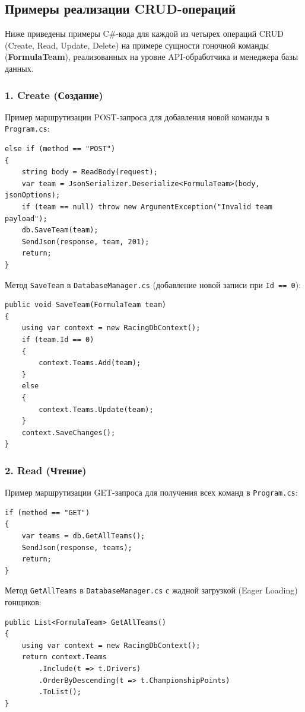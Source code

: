 \documentclass[oneside,a4paper,14pt]{extarticle}
\begin{document}
\subsection*{Примеры реализации CRUD-операций}

Ниже приведены примеры C\#-кода для каждой из четырех операций CRUD (Create, Read, Update, Delete) на примере сущности гоночной команды (\textbf{FormulaTeam}), реализованных на уровне API-обработчика и менеджера базы данных.

\subsubsection*{1. Create (Создание)}
Пример маршрутизации POST-запроса для добавления новой команды в \texttt{Program.cs}:
\begin{verbatim}
else if (method == "POST")
{
    string body = ReadBody(request);
    var team = JsonSerializer.Deserialize<FormulaTeam>(body, jsonOptions);
    if (team == null) throw new ArgumentException("Invalid team payload");
    db.SaveTeam(team);
    SendJson(response, team, 201);
    return;
}
\end{verbatim}

Метод \texttt{SaveTeam} в \texttt{DatabaseManager.cs} (добавление новой записи при \texttt{Id == 0}):
\begin{verbatim}
public void SaveTeam(FormulaTeam team)
{
    using var context = new RacingDbContext();
    if (team.Id == 0)
    {
        context.Teams.Add(team);
    }
    else
    {
        context.Teams.Update(team);
    }
    context.SaveChanges();
}
\end{verbatim}

\subsubsection*{2. Read (Чтение)}
Пример маршрутизации GET-запроса для получения всех команд в \texttt{Program.cs}:
\begin{verbatim}
if (method == "GET")
{
    var teams = db.GetAllTeams();
    SendJson(response, teams);
    return;
}
\end{verbatim}

Метод \texttt{GetAllTeams} в \texttt{DatabaseManager.cs} с жадной загрузкой (Eager Loading) гонщиков:
\begin{verbatim}
public List<FormulaTeam> GetAllTeams()
{
    using var context = new RacingDbContext();
    return context.Teams
        .Include(t => t.Drivers)
        .OrderByDescending(t => t.ChampionshipPoints)
        .ToList();
}
\end{verbatim}
\end{document}
